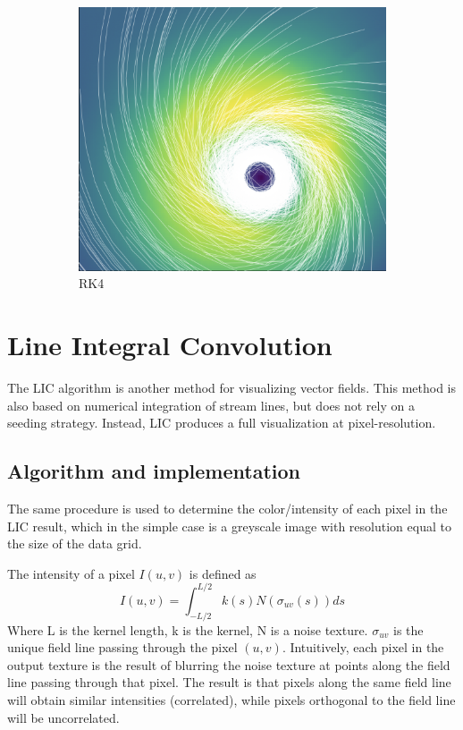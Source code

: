 \documentclass{article}
\begin{document}
\begin{figure}[h!]
\begin{subfigure}{0.48\textwidth}
        \includegraphics[width=\textwidth, angle=0]{rk4.png}
        \caption{RK4}
    \end{subfigure}
    \caption{}
\end{figure}

\section{Line Integral Convolution}
The LIC algorithm is another method for visualizing vector fields. This method is also based on numerical integration of stream lines,
but does not rely on a seeding strategy. Instead, LIC produces a full visualization at pixel-resolution.

\subsection{Algorithm and implementation}
The same procedure is used to determine the color/intensity of each pixel in the LIC result, which in the simple case is a greyscale image
with resolution equal to the size of the data grid.

The intensity of a pixel $I(u, v)$ is defined as
$$I(u, v) = \int_{-L/2}^{L/2}k(s)N(\sigma_{uv}(s))ds$$
Where L is the kernel length, k is the kernel, N is a noise
texture. $\sigma_{uv}$ is the unique field line passing through the pixel $(u, v)$. Intuitively, each pixel
in the output texture is the result of blurring the noise texture at points along the field line passing through that pixel.
The result is that pixels along the same field line will obtain similar intensities (correlated), while pixels orthogonal to the field line will be uncorrelated.
\end{document}
